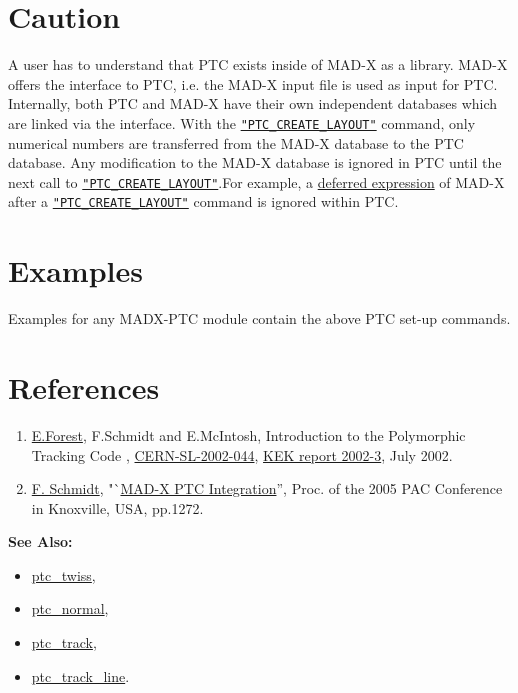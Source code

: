 \section{Caution}

A user has to understand that PTC exists inside of MAD-X as a
library. MAD-X offers the interface to PTC, i.e. the MAD-X input file is
used as input for PTC. Internally, both PTC and MAD-X have their own
independent databases which are linked via the interface. With the
\texttt{\hyperlink{PTC_CREATE_LAYOUT}{"PTC\_CREATE\_LAYOUT"}} command,
only numerical numbers are transferred from the MAD-X database to the
PTC database. Any modification to the MAD-X database is ignored in PTC
until the next call to
\texttt{\hyperlink{PTC_CREATE_LAYOUT}{"PTC\_CREATE\_LAYOUT"}}.For
example, a \href{../Introduction/expression.html#defer}{deferred
  expression} of MAD-X after a
\texttt{\hyperlink{PTC_CREATE_LAYOUT}{"PTC\_CREATE\_LAYOUT"}} command is
ignored within PTC.  


\section{Examples}

 Examples for any MADX-PTC module contain the above PTC set-up commands. 


\section{References}

\begin{enumerate}
   \item \href{E.Forest}{E.Forest}, F.Schmidt and E.McIntosh,
     Introduction to the Polymorphic Tracking Code ,
     \href{http://cern.ch/madx/doc/sl-2002-044.pdf}{CERN-SL-2002-044},
     \href{http://ccdb4fs.kek.jp/cgi-bin/img/allpdf?200302020}{KEK
       report 2002-3}, July 2002. 
   \item \href{F.Schmidt}{F. Schmidt},
     "`\href{http://cern.ch/madx/doc/MPPE012.pdf}{MAD-X PTC
     Integration}'', Proc. of the 2005 PAC Conference in
     Knoxville, USA, pp.1272. 
\end{enumerate}


{\bf See Also:}
\begin{itemize} 
   \item \href{../ptc_twiss/ptc_twiss.html}{ptc\_twiss},
   \item \href{../ptc_normal/ptc_normal.html}{ptc\_normal},
   \item \href{../ptc_track/ptc_track.html}{ ptc\_track},
   \item \href{../ptc_track_line/ptc_track_line.html}{ptc\_track\_line}. 
\end{itemize}


